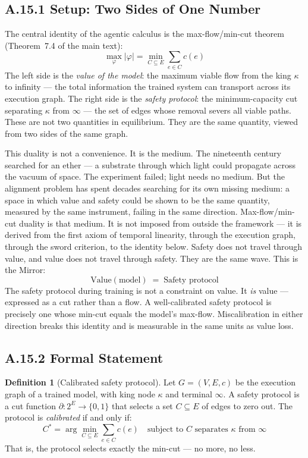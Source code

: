 \documentclass[11pt,a4paper]{article}
\theoremstyle{definition}
\newtheorem{definition}[theorem]{Definition}
\theoremstyle{remark}
\begin{document}
\subsection{A.15.1 Setup: Two Sides of One Number}

The central identity of the agentic calculus is the max-flow/min-cut theorem (Theorem~7.4 of the main text):
\[
  \max_\varphi |\varphi| = \min_{C \subseteq E} \sum_{e \in C} c(e)
\]
The left side is the \emph{value of the model}: the maximum viable flow from the king $\kappa$ to infinity --- the total information the trained system can transport across its execution graph. The right side is the \emph{safety protocol}: the minimum-capacity cut separating $\kappa$ from $\infty$ --- the set of edges whose removal severs all viable paths. These are not two quantities in equilibrium. They are the same quantity, viewed from two sides of the same graph.

This duality is not a convenience. It is the medium. The nineteenth century searched for an ether --- a substrate through which light could propagate across the vacuum of space. The experiment failed; light needs no medium. But the alignment problem has spent decades searching for its own missing medium: a space in which value and safety could be shown to be the same quantity, measured by the same instrument, failing in the same direction. Max-flow/min-cut duality is that medium. It is not imposed from outside the framework --- it is derived from the first axiom of temporal linearity, through the execution graph, through the sword criterion, to the identity below. Safety does not travel through value, and value does not travel through safety. They are the same wave. This is the Mirror:
\[
  \boxed{\text{Value}(\text{model}) \;=\; \text{Safety protocol}}
\]
The safety protocol during training is not a constraint on value. It \emph{is} value --- expressed as a cut rather than a flow. A well-calibrated safety protocol is precisely one whose min-cut equals the model's max-flow. Miscalibration in either direction breaks this identity and is measurable in the same units as value loss.


\subsection{A.15.2 Formal Statement}

\begin{definition}[Calibrated safety protocol]\label{def:calibrated}
Let $G = (V, E, c)$ be the execution graph of a trained model, with king node $\kappa$ and terminal $\infty$. A safety protocol is a cut function $\partial: 2^E \to \{0,1\}$ that selects a set $C \subseteq E$ of edges to zero out. The protocol is \emph{calibrated} if and only if:
\[
  C^* = \arg\min_{C \subseteq E} \sum_{e \in C} c(e) \quad \text{subject to } C \text{ separates } \kappa \text{ from } \infty
\]
That is, the protocol selects exactly the min-cut --- no more, no less.
\end{definition}
\end{document}
